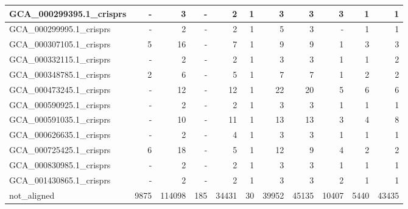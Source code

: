 \documentclass[12pt,a4paper]{article}
\begin{document}
\begin{table}[ht]
\begin{center}
\begin{tabular}{|l*{10}{|r}|}
GCA\_000299395.1\_crisprs & - & 3 & - & 2 & 1 & 3 & 3 & 3 & 1 & 1 \\ \hline
GCA\_000299995.1\_crisprs & - & 2 & - & 2 & 1 & 5 & 3 & - & 1 & 1 \\ \hline
GCA\_000307105.1\_crisprs & 5 & 16 & - & 7 & 1 & 9 & 9 & 1 & 3 & 3 \\ \hline
GCA\_000332115.1\_crisprs & - & 2 & - & 2 & 1 & 3 & 3 & 1 & 1 & 2 \\ \hline
GCA\_000348785.1\_crisprs & 2 & 6 & - & 5 & 1 & 7 & 7 & 1 & 2 & 2 \\ \hline
GCA\_000473245.1\_crisprs & - & 12 & - & 12 & 1 & 22 & 20 & 5 & 6 & 6 \\ \hline
GCA\_000590925.1\_crisprs & - & 2 & - & 2 & 1 & 3 & 3 & 1 & 1 & 1 \\ \hline
GCA\_000591035.1\_crisprs & - & 10 & - & 11 & 1 & 13 & 13 & 3 & 4 & 8 \\ \hline
GCA\_000626635.1\_crisprs & - & 2 & - & 4 & 1 & 3 & 3 & 1 & 1 & 1 \\ \hline
GCA\_000725425.1\_crisprs & 6 & 18 & - & 5 & 1 & 12 & 9 & 4 & 2 & 2 \\ \hline
GCA\_000830985.1\_crisprs & - & 2 & - & 2 & 1 & 3 & 3 & 1 & 1 & 1 \\ \hline
GCA\_001430865.1\_crisprs & - & 2 & - & 2 & 1 & 3 & 3 & 2 & 1 & 1 \\ \hline
not\_aligned & 9875 & 114098 & 185 & 34431 & 30 & 39952 & 45135 & 10407 & 5440 & 43435 \\ \hline
\end{tabular}
\end{center}
\end{table}
\end{document}
